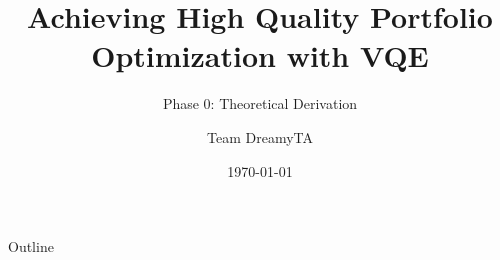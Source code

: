\documentclass{beamer}
\title[Portfolio Optimization VQE]{Achieving High Quality Portfolio Optimization with VQE}
\subtitle{Phase 0: Theoretical Derivation}
\author{Team DreamyTA}
\date{\today}
\begin{document}
\begin{frame}
    \titlepage
\end{frame}

\begin{frame}{Outline}
    \tableofcontents
\end{frame}



\end{document}
